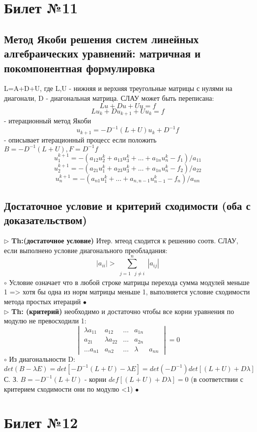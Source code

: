 \documentclass[a4paper]{article}
\begin{document}
\section{Билет №11}
\subsection{Метод Якоби решения систем линейных алгебраических уравнений: матричная и покомпонентная формулировка}
L=A+D+U, где L,U - нижняя и верхняя треугольные матрицы с нулями на диагонали, D - диагональная матрица. СЛАУ может быть переписана:
$$ Lu + Du + Uu = f$$
$$ Lu_k + Du_{k+1} + Uu_k =f$$ - итерационный метод Якоби
$$ u_{k+1} = -D^{-1}(L+U)u_k + D^{-1}f$$ - описывает итерационный процесс если положить $ B=-D^{-1}(L+U), F=D^{-1}f$
$$ u_1^{k+1}=-(a_{12}u_2^k + a_{13}u_3^k + \ldots + a_{1n}u_n^k - f_1)/a_{11}$$
$$ u_2^{k+1}=-(a_{21}u_1^k + a_{23}u_3^k + \ldots + a_{1n}u_n^k - f_2)/a_{22}$$
$$ u_n^{k+1}=-(a_{n1}u_1^k + \ldots + a_{n,n-1}u_{n-1}^k - f_n)/a_{nn} $$
\subsection{Достаточное условие и критерий сходимости (оба с доказательством)}
$\triangleright$ \textbf{Th:(достаточное условие)} Итер. мтеод сходится к решению соотв. СЛАУ, если выполнено условие диагонального преобладания:
$$ |a_{ii}| > \sum_{\substack{j=1}\substack{j \neq i}}^n |a_{ij}|$$
	$\circ$ 
		Условие означает что в любой строке матрицы перехода сумма модулей меньше 1 => хотя бы одна из норм матрицы меньше 1, выполняется условие сходимости метода простых итераций 
	$\bullet$ \\

$\triangleright$ \textbf{Th: (критерий)} необходимо и достаточно чтобы все корни уравнения по модулю не превосходили 1:
$$ \begin{vmatrix} 
\lambda a_{11} & a_{12} & \ldots & a_{1n} \\
a_{21} & \lambda a_{22} & \ldots & a_{2n} \\
\ldots
a_{n1} & a_{n2} & \ldots & \lambda & a_{nn}
\end{vmatrix} = 0 $$
	$\circ$ 
		Из диагональности D:
		$$ det(B-\lambda E) = det[-D^{-1}(L+U) - \lambda E] = det(-D^{-1}) det[(L+U) + D\lambda] $$
		С. З. $B=-D^{-1}(L+U)$ - корни $def[(L+U)+D\lambda]=0$ (в соответствии с критерием сходимости они по модулю <1)
	$\bullet$

\section{Билет №12}
\end{document}
